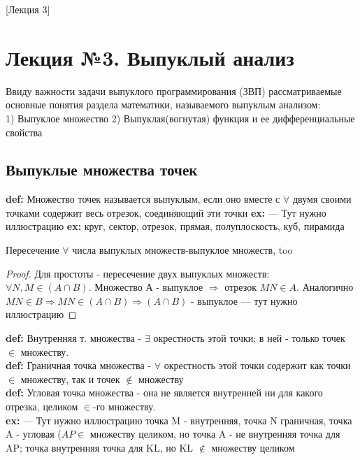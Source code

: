 [Лекция 3]

\newpage

\section{Лекция №3. Выпуклый анализ}
Ввиду важности задачи выпуклого программирования (ЗВП) рассматриваемые основные понятия раздела математики, называемого выпуклым анализом: \\ 1) Выпуклое множество 2) Выпуклая(вогнутая) функция и ее дифференциальные свойства

\subsection{Выпуклые множества точек}
\textbf{def:}
Множество точек называется выпуклым, если оно вместе с $\forall$ двумя своими точками содержит весь отрезок, соединяющий эти точки
\textbf{ex:} --- Тут нужно иллюстрацию
\textbf{ex:} круг, сектор, отрезок, прямая, полуплоскость, куб, пирамида

\begin{theorem}
Пересечение $\forall$ числа выпуклых множеств-выпуклое множеств, too
\end{theorem}

\renewcommand\qedsymbol{$\blacksquare$}

\begin{proof}
Для простоты - пересечение двух выпуклых множеств: \\ $\forall N,M \in (A \cap B)$. Множество А - выпуклое $\Rightarrow$ отрезок $MN \in A$. Аналогично \\ $MN \in B $$\Rightarrow$$ MN \in (A \cap B) $$\Rightarrow$$ (A \cap B)$ - выпуклое --- тут нужно иллюстрацию
\end{proof}

\textbf{def:} Внутренняя т. множества - $\exists$ окрестность этой точки: в ней - только точек $\in$ множеству. \\

\textbf{def:} Граничная точка множества - $\forall$ окрестность этой точки содержит как точки $\in$ множеству, так и точек $\notin$ множеству \\

\textbf{def:} Угловая точка множества - она не является внутренней ни для какого отрезка, целиком $\in$-го множеству. \\

\textbf{ex:}
--- Тут нужно иллюстрацию
точка M - внутренняя, точка N граничная, точка A - угловая ($AP \in$ множеству целиком, но точка A - не внутренняя точка для AP; точка внутренняя точка для KL, но KL $\notin$ множеству целиком \\

